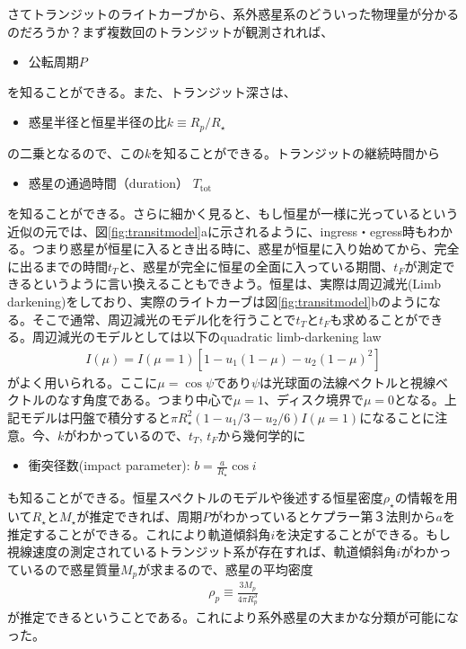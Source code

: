 さてトランジットのライトカーブから、系外惑星系のどういった物理量が分かるのだろうか？まず複数回のトランジットが観測されれば、
\begin{itemize}
\item 公転周期$P$
\end{itemize}
を知ることができる。また、トランジット深さは、
\begin{itemize}
\item 惑星半径と恒星半径の比$k \equiv R_p/R_\star$
\end{itemize}
の二乗となるので、この$k$を知ることができる。トランジットの継続時間から
\begin{itemize}
\item 惑星の通過時間（duration） $T_\mathrm{tot}$
\end{itemize}
を知ることができる。さらに細かく見ると、もし恒星が一様に光っているという近似の元では、図\ref{fig:transitmodel}aに示されるように、ingress・egress時もわかる。つまり惑星が恒星に入るとき出る時に、惑星が恒星に入り始めてから、完全に出るまでの時間$t_T$と、惑星が完全に恒星の全面に入っている期間、$t_F$が測定できるというように言い換えることもできよう。恒星は、実際は周辺減光(Limb darkening)をしており、実際のライトカーブは図\ref{fig:transitmodel}bのようになる。そこで通常、周辺減光のモデル化を行うことで$t_T$と$t_F$も求めることができる。周辺減光のモデルとしては以下のquadratic limb-darkening law
\begin{align}
I(\mu) = I(\mu=1) [ 1 - u_1 (1 - \mu) - u_2 (1 -\mu)^2] 
\end{align}
がよく用いられる。ここに$\mu = \cos{\psi}$であり$\psi$は光球面の法線ベクトルと視線ベクトルのなす角度である。つまり中心で$\mu=1$、ディスク境界で$\mu=0$となる。上記モデルは円盤で積分すると$\pi R_\star^2 (1 - u_1/3 - u_2/6) I(\mu=1)$になることに注意。今、$k$がわかっているので、$t_T$, $t_F$から幾何学的に
\begin{itemize}
\item 衝突径数(impact parameter): $b = \frac{a}{R_\star} \cos{i} $
\end{itemize}
も知ることができる。恒星スペクトルのモデルや後述する恒星密度$\rho_\star$の情報を用いて$R_\star$と$M_\star$が推定できれば、周期$P$がわかっているとケプラー第３法則から$a$を推定することができる。これにより軌道傾斜角$i$を決定することができる。もし視線速度の測定されているトランジット系が存在すれば、軌道傾斜角$i$がわかっているので惑星質量$M_p$が求まるので、惑星の平均密度
\begin{align}
\rho_p \equiv \frac{3 M_p}{4 \pi R_p^3}
\end{align}
が推定できるということである。これにより系外惑星の大まかな分類が可能になった。

